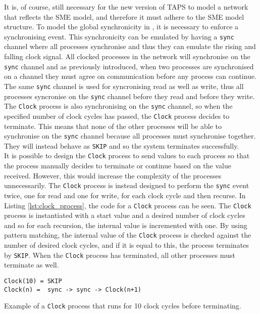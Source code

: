 It is, of course, still necessary for the new version of TAPS to model a \cspm{} network that reflects the SME model, and therefore it must adhere to the SME model structure. To model the global synchronicity in \cspm{}, it is necessary to enforce a synchronising event. This synchronicity can be emulated by having a \texttt{sync} channel where all processes synchronise and thus they can emulate the rising and falling clock signal. All clocked processes in the network will synchronise on the \texttt{sync} channel and as previously introduced, when two processes are synchronised on a channel they must agree on communication before any process can continue. The same \texttt{sync} channel is used for syncronising read as well as write, thus all processes syncronise on the \texttt{sync} channel before they read and before they write.
The \texttt{Clock} process is also synchronising on the \texttt{sync} channel, so when the specified number of clock cycles has passed, the \texttt{Clock} process decides to terminate.
This means that none of the other processes will be able to synchronise on the \texttt{sync} channel because all processes must synchronise together. They will instead behave as \texttt{SKIP} and so the system terminates successfully.\\

It is possible to design the \texttt{Clock} process to send values to each process so that the process manually decides to terminate or continue based on the value received. However, this would increase the complexity of the processes unnecessarily. The \texttt{Clock} process is instead designed to perform the \texttt{sync} event twice, one for read and one for write, for each clock cycle and then recurse. In Listing \ref{lst:clock_process}, the \cspm{} code for a \texttt{Clock} process can be seen. The \texttt{Clock} process is instantiated with a start value and a desired number of clock cycles and so for each recursion, the internal value is incremented with one. By using pattern matching, the internal value of the \texttt{Clock} process is checked against the number of desired clock cycles, and if it is equal to this, the process terminates by \texttt{SKIP}. When the \texttt{Clock} process has terminated, all other processes must terminate as well.
\begin{listing}
\begin{verbatim}
Clock(10) = SKIP
Clock(n) =  sync -> sync -> Clock(n+1)
\end{verbatim}
\caption{Example of a \texttt{Clock} process that runs for 10 clock cycles before terminating. }
\label{lst:clock_process}
\end{listing}

